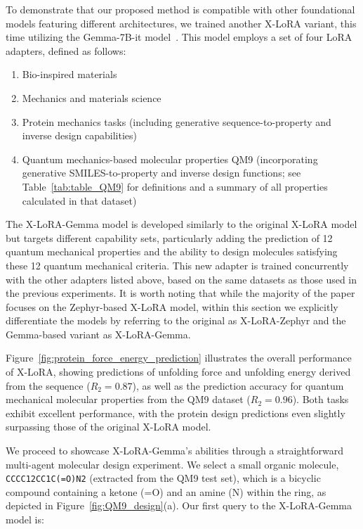 To demonstrate that our proposed method is compatible with other foundational models featuring different architectures, we trained another X-LoRA variant, this time utilizing the Gemma-7B-it model~\cite{Google/gemma-7b-itFace}. This model employs a set of four LoRA adapters, defined as follows:

\begin{enumerate}
    \item Bio-inspired materials \item Mechanics and materials science \item Protein mechanics tasks (including generative sequence-to-property and inverse design capabilities) \item Quantum mechanics-based molecular properties QM9 (incorporating generative SMILES-to-property and inverse design functions; see Table~\ref{tab:table_QM9} for definitions and a summary of all properties calculated in that dataset)~\cite{Ruddigkeit2012EnumerationGDB-17,Ramakrishnan2015ElectronicSpace}
\end{enumerate}

The X-LoRA-Gemma model is developed similarly to the original X-LoRA model but targets different capability sets, particularly adding the prediction of 12 quantum mechanical properties and the ability to design molecules satisfying these 12 quantum mechanical criteria. This new adapter is trained concurrently with the other adapters listed above, based on the same datasets as those used in the previous experiments. It is worth noting that while the majority of the paper focuses on the Zephyr-based X-LoRA model, within this section we explicitly differentiate the models by referring to the original as X-LoRA-Zephyr and the Gemma-based variant as X-LoRA-Gemma.

Figure~\ref{fig:protein_force_energy_prediction} illustrates the overall performance of X-LoRA, showing predictions of unfolding force and unfolding energy derived from the sequence ($R_2 = 0.87$), as well as the prediction accuracy for quantum mechanical molecular properties from the QM9 dataset ($R_2 = 0.96$). Both tasks exhibit excellent performance, with the protein design predictions even slightly surpassing those of the original X-LoRA model.

We proceed to showcase X-LoRA-Gemma’s abilities through a straightforward multi-agent molecular design experiment. We select a small organic molecule, \texttt{CCCC12CC1C(=O)N2} (extracted from the QM9 test set), which is a bicyclic compound containing a ketone (=O) and an amine (N) within the ring, as depicted in Figure~\ref{fig:QM9_design}(a). Our first query to the X-LoRA-Gemma model is:

